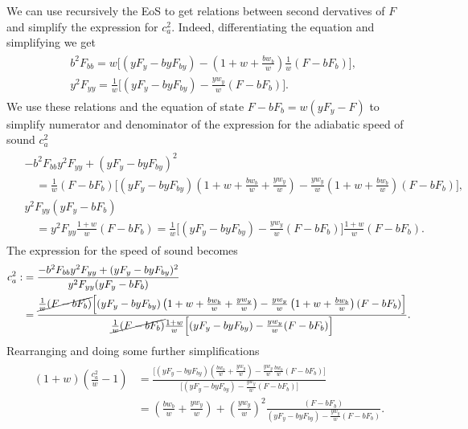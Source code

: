 We can use recursively the EoS to get relations between second dervatives of $F$ and simplify the expression for $c_a^2$.
Indeed, differentiating the equation and simplifying we get
{\small
\begin{align}\begin{aligned}
    &b^2F_{bb}= w \Big[(yF_y-byF_{by})-\left(1+w+\tfrac{bw_b}{w}\right)\tfrac{1}{w}(F-bF_b)\Big],\\
    &y^2F_{yy}=\tfrac{1}{w}\Big[(yF_y-byF_{by})-\tfrac{yw_y}{w}(F-bF_b)\Big].
\end{aligned}\end{align}}
We use these relations and the equation of state $F-bF_b=w(yF_y-F)$ to simplify numerator and denominator of the expression for the adiabatic speed of sound $c_a^2$
{\small
\begin{align}\begin{aligned}
    &-b^2F_{bb}y^2F_{yy}+(yF_y-byF_{by})^2\\
    &\quad=\tfrac{1}{w}(F-bF_b)\Big[(yF_y-byF_{by})\left(1+w+\tfrac{bw_b}{w}+\tfrac{yw_y}{w}\right)-\tfrac{yw_y}{w}\left(1+w+\tfrac{bw_b}{w}\right)(F-bF_b)\Big],\\
    &y^2F_{yy}(yF_y-bF_b)\\
    &\quad=y^2F_{yy}\tfrac{1+w}{w}(F-bF_b)=
    \tfrac{1}{w}\Big[(yF_y-byF_{by})-\tfrac{yw_y}{w}(F-bF_b)\Big] \tfrac{1+w}{w}(F-bF_b).
\end{aligned}\end{align}}
The expression for the speed of sound becomes 
{\small
\begin{align}\begin{aligned}
    c_a^2:&=\frac{-b^2F_{bb}y^2F_{yy}+(yF_y-byF_{by})^2}{y^2F_{yy}(yF_y-bF_b)}\\
    &=\frac{\cancel{\tfrac{1}{w}(F-bF_b)}\Big[(yF_y-byF_{by})\left(1+w+\tfrac{bw_b}{w}+\tfrac{yw_y}{w}\right)-\tfrac{yw_y}{w}\left(1+w+\tfrac{bw_b}{w}\right)(F-bF_b)\Big]}{\cancel{\tfrac{1}{w}(F-bF_b)}\tfrac{1+w}{w}\Big[(yF_y-byF_{by})-\tfrac{yw_y}{w}(F-bF_b)\Big] }.
\end{aligned}\end{align}}
Rearranging and doing some further simplifications
{\small
\begin{align}\begin{aligned}
    (1+w)\left(\frac{c_a^2}{w}-1\right)
    &=\frac{\Big[(yF_y-byF_{by})\left(\tfrac{bw_b}{w}+\tfrac{yw_y}{w}\right)-\tfrac{yw_y}{w}\tfrac{bw_b}{w}(F-bF_b)\Big]}{\Big[(yF_y-byF_{by})-\tfrac{yw_y}{w}(F-bF_b)\Big]}\\[3pt]
    &=\left(\tfrac{bw_b}{w}+\tfrac{yw_y}{w}\right)+\left(\tfrac{yw_y}{w}\right)^2 \frac{(F-bF_b)}{(yF_y-byF_{by})-\tfrac{yw_y}{w}(F-bF_b)}.
\end{aligned}\end{align}}
